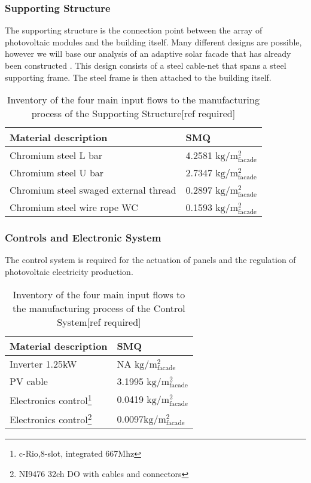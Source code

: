 \subsubsection*{Supporting Structure}
The supporting structure is the connection point between the array of photovoltaic modules and the building itself. Many different designs are possible, however we will base our analysis of an adaptive solar facade that has already been constructed \cite{nagy2015frontiers}. This design consists of a steel cable-net that spans a steel supporting frame. The steel frame is then attached to the building itself.\\

\begin{table}[H]
\centering
\begin{tabular}{ll}
\hline
Material description & SMQ \\ \hline
Chromium steel L bar	 & 4.2581 ${\mathrm{kg/m^2_{facade}}}$ \\
Chromium steel U bar  & 2.7347 ${\mathrm{kg/m^2_{facade}}}$\\
Chromium steel swaged external thread  &0.2897 ${\mathrm{kg/m^2_{facade}}}$\\
Chromium steel wire rope WC  & 0.1593 ${\mathrm{kg/m^2_{facade}}}$\\
\hline
\end{tabular}
\caption{Inventory of the four main input flows to the manufacturing process of the Supporting Structure[ref required]}
\label{tab:StructureInv}
\end{table}

\subsubsection*{Controls and Electronic System}
The control system is required for the actuation of panels and the regulation of photovoltaic electricity production.\\

\begin{table}[H]
\centering
\begin{tabular}{ll}
\hline
Material description & SMQ \\ \hline
Inverter 1.25kW	 & NA ${\mathrm{kg/m^2_{facade}}}$ \\
PV cable  & 3.1995 ${\mathrm{kg/m^2_{facade}}}$\\
Electronics control\footnote{c-Rio,8-slot, integrated 667Mhz}& 0.0419 ${\mathrm{kg/m^2_{facade}}}$\\
Electronics control\footnote{NI9476 32ch DO with cables and connectors}& 0.0097${\mathrm{kg/m^2_{facade}}}$\\
\hline
\end{tabular}
\caption{Inventory of the four main input flows to the manufacturing process of the Control System[ref required]}
\label{tab:ControlInv}
\end{table}

